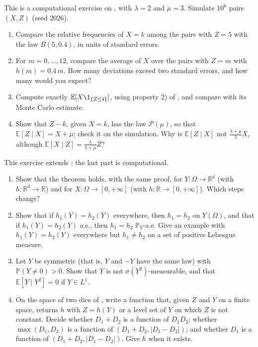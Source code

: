\begin{exercise}\label{ex:ce-poisson-simulation}
\easy This is a computational exercise on , with $\lambda=2$ and
$\mu=3$. Simulate $10^6$ pairs $(X,Z)$ (seed $2026$).
\begin{enumerate}[label=(\alph*)]
  \item Compare the relative frequencies of $X=k$ among the pairs with $Z=5$ with the law
    $B(5,0.4)$, in units of standard errors.
  \item For $m=0,\dots,12$, compare the average of $X$ over the pairs with $Z=m$ with
    $h(m)=0.4\,m$. How many deviations exceed two standard errors, and how many would you expect?
  \item Compute exactly $\mathbb E[X\1_{\{Z\le4\}}]$, using property 2) of
    , and compare with its Monte Carlo estimate.
  \item Show that $Z-k$, given $X=k$, has the law $\mathcal P(\mu)$, so that
    $\mathbb E[Z\mid X]=X+\mu$; check it on the simulation. Why is $\mathbb E[Z\mid X]$ not
    $\frac{\lambda+\mu}\lambda X$, although $\mathbb E[X\mid Z]=\frac\lambda{\lambda+\mu}Z$?
\end{enumerate}
\end{exercise}

\begin{exercise}[Functions of $Y$]\label{ex:ce-doob-dynkin}
\medium This exercise extends ; the last part is computational.
\begin{enumerate}[label=(\alph*)]
  \item Show that the theorem holds, with the same proof, for $Y:\Omega\to\mathbb R^d$ (with
    $h:\mathbb R^d\to\mathbb R$) and for $X:\Omega\to[0,+\infty]$ (with
    $h:\mathbb R\to[0,+\infty]$). Which steps change?
  \item Show that if $h_1(Y)=h_2(Y)$ everywhere, then $h_1=h_2$ on $Y(\Omega)$, and that if
    $h_1(Y)=h_2(Y)$ a.s., then $h_1=h_2$ $\mathbb P_Y$-a.e. Give an example with $h_1(Y)=h_2(Y)$
    everywhere but $h_1\ne h_2$ on a set of positive Lebesgue measure.
  \item Let $Y$ be symmetric (that is, $Y$ and $-Y$ have the same law) with $\mathbb P(Y\ne0)>0$.
    Show that $Y$ is not $\sigma(Y^2)$-measurable, and that $\mathbb E[Y\mid Y^2]=0$ if
    $Y\in L^1$.
  \item On the space of two dice of , write a function that, given $Z$ and
    $Y$ on a finite space, returns $h$ with $Z=h(Y)$ or a level set of $Y$ on which $Z$ is not
    constant. Decide whether $D_1+D_2$ is a function of $D_1D_2$; whether $\max(D_1,D_2)$ is a
    function of $(D_1+D_2,|D_1-D_2|)$; and whether $D_1$ is a function of
    $(D_1+D_2,|D_1-D_2|)$. Give $h$ when it exists.
\end{enumerate}
\end{exercise}
